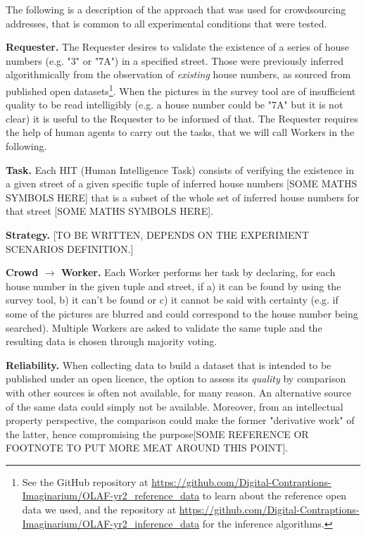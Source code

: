\documentclass{llncs}
\begin{document}
The following is a description of the approach that was used for crowdsourcing addresses, that is common to all experimental conditions that were tested.

\textbf{Requester.} The Requester desires to validate the existence of a series of house numbers (e.g. "3" or "7A") in a specified street. Those were previously inferred algorithmically from the observation of \textit{existing} house numbers, as sourced from published open datasets\footnote{See the GitHub repository at \url{https://github.com/Digital-Contraptions-Imaginarium/OLAF-yr2_reference_data} to learn about the reference open data we used, and the repository at \url{https://github.com/Digital-Contraptions-Imaginarium/OLAF-yr2_inference_data} for the inference algorithms.}. When the pictures in the survey tool are of insufficient quality to be read intelligibly (e.g. a house number could be "7A" but it is not clear) it is useful to the Requester to be informed of that. The Requester requires the help of human agents to carry out the tasks, that we will call Workers in the following.

\textbf{Task.} Each HIT (Human Intelligence Task) consists of verifying the existence in a given street of a given specific tuple of inferred house numbers {[}SOME MATHS SYMBOLS HERE{]} that is a subset of the whole set of inferred house numbers for that street {[}SOME MATHS SYMBOLS HERE{]}. 

\textbf{Strategy.} 
{[}TO BE WRITTEN, DEPENDS ON THE EXPERIMENT SCENARIOS DEFINITION.{]}

\textbf{Crowd $\rightarrow$ Worker.} Each Worker performs her task by declaring, for each house number in the given tuple and street, if a) it can be found by using the survey tool, b) it can't be found or c) it cannot be said with certainty (e.g. if some of the pictures are blurred and could correspond to the house number being searched). Multiple Workers are asked to validate the same tuple and the resulting data is chosen through majority voting.

\textbf{Reliability.} When collecting data to build a dataset that is intended to be published under an open licence, the option to assess its \textit{quality} by comparison with other sources is often not available, for many reason. An alternative source of the same data could simply not be available. Moreover, from an intellectual property perspective, the comparison could make the former "derivative work" of the latter, hence compromising the purpose{[}SOME REFERENCE OR FOOTNOTE TO PUT MORE MEAT AROUND THIS POINT{]}. 
\end{document}
